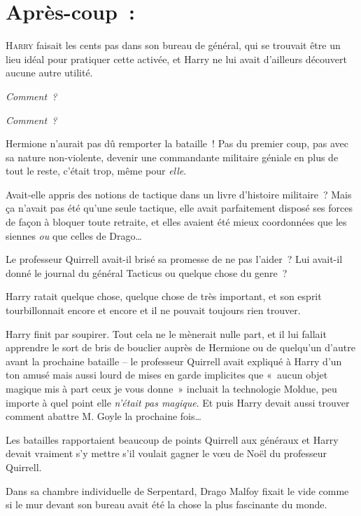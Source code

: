 
\section{Après-coup~:}

\lettrine{H}{arry} faisait les cents pas dans son bureau de général, qui se trouvait être un lieu idéal pour pratiquer cette activée, et Harry ne lui avait d'ailleurs découvert aucune autre utilité.

\emph{Comment~?}

\emph{Comment~?}

Hermione n'aurait pas dû remporter la bataille~!
Pas du premier coup, pas avec sa nature non-violente, devenir une commandante militaire géniale en plus de tout le reste, c'était trop, même pour \emph{elle}.

Avait-elle appris des notions de tactique dans un livre d'histoire militaire~?
Mais ça n'avait pas été qu'une seule tactique, elle avait parfaitement disposé ses forces de façon à bloquer toute retraite, et elles avaient été mieux coordonnées que les siennes \emph{ou} que celles de Drago…

Le professeur Quirrell avait-il brisé sa promesse de ne pas l'aider~?
Lui avait-il donné le journal du général Tacticus ou quelque chose du genre~?

Harry ratait quelque chose, quelque chose de très important, et son esprit tourbillonnait encore et encore et il ne pouvait toujours rien trouver.

Harry finit par soupirer.
Tout cela ne le mènerait nulle part, et il lui fallait apprendre le sort de bris de bouclier auprès de Hermione ou de quelqu'un d'autre avant la prochaine bataille -- le professeur Quirrell avait expliqué à Harry d'un ton amusé mais aussi lourd de mises en garde implicites que «~aucun objet magique mis à part ceux je vous donne~» incluait la technologie Moldue, peu importe à quel point elle \emph{n'était pas magique}.
Et puis Harry devait aussi trouver comment abattre M. Goyle la prochaine fois…

Les batailles rapportaient beaucoup de points Quirrell aux généraux et Harry devait vraiment s'y mettre s'il voulait gagner le vœu de Noël du professeur Quirrell.

\later

Dans sa chambre individuelle de Serpentard, Drago Malfoy fixait le vide comme si le mur devant son bureau avait été la chose la plus fascinante du monde.

